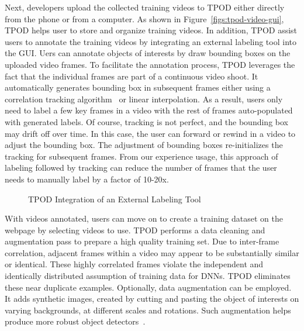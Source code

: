 Next, developers upload the collected training videos to TPOD either directly
from the phone or from a computer. As shown in Figure~\ref{figs:tpod-video-gui},
TPOD helps user to store and organize training videos. In addition, TPOD assist
users to annotate the training videos by integrating an external labeling tool
into the GUI. Uers can annotate objects of interests by draw bounding boxes on
the uploaded video frames. To facilitate the annotation process, TPOD leverages
the fact that the individual frames are part of a continuous video shoot. It
automatically generates bounding box in subsequent frames either using a
correlation tracking algorithm~\cite{danelljan2014accurate} or linear
interpolation. As a result, users only need to label a few key frames in a video
with the rest of frames auto-populated with generated labels. Of course,
tracking is not perfect, and the bounding box may drift off over time. In this
case, the user can forward or rewind in a video to adjust the bounding box.  The
adjustment of bounding boxes re-initializes the tracking for subsequent frames.
From our experience usage, this approach of labeling followed by tracking can
reduce the number of frames that the user needs to manually label by a factor of
10-20x.

\begin{figure}[]
  \centering
    \caption{TPOD Integration of an External Labeling Tool}
  \label{figs:tpod-label-gui}
\end{figure}

With videos annotated, users can move on to create a training dataset on the
webpage by selecting videos to use. TPOD performs a data cleaning and
augmentation pass to prepare a high quality training set. Due to inter-frame
correlation, adjacent frames within a video may appear to be substantially
similar or identical. These highly correlated frames violate the independent and
identically distributed assumption of training data for DNNs. TPOD eliminates
these near duplicate examples. Optionally, data augmentation can be employed. It
adds synthetic images, created by cutting and pasting the object of interests on
varying backgrounds, at different scales and rotations. Such augmentation helps
produce more robust object detectors~\cite{dwibedi2017cut}.

